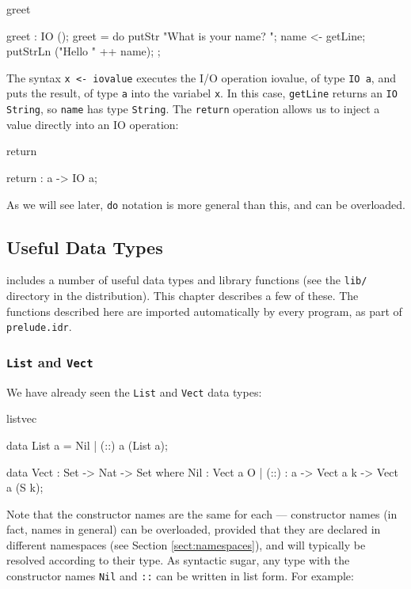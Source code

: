\begin{SaveVerbatim}{greet}

greet : IO ();
greet = do { putStr "What is your name? ";
             name <- getLine;
             putStrLn ("Hello " ++ name);
           };

\end{SaveVerbatim}

The syntax \texttt{x <- iovalue} executes the I/O operation iovalue, of type 
\texttt{IO a}, and
puts the result, of type \texttt{a} into the variabel \texttt{x}. 
In this case, \texttt{getLine} returns an \texttt{IO String},
so \texttt{name} has type \texttt{String}.
The \texttt{return} operation allows us to inject a value directly into an IO
operation:

\begin{SaveVerbatim}{return}

return : a -> IO a;

\end{SaveVerbatim}

\noindent
As we will see later, \texttt{do} notation is more general than this, and can be
overloaded.

\subsection{Useful Data Types}

\Idris{} includes a number of useful data types and library functions (see the
\texttt{lib/} directory in the distribution). This chapter describes a few of these. The
functions described here are imported automatically by every \Idris{} program, as
part of \texttt{prelude.idr}.

\subsubsection{\texttt{List} and \texttt{Vect}}

We have already seen the \texttt{List} and \texttt{Vect} data types:

\begin{SaveVerbatim}{listvec}

data List a = Nil | (::) a (List a);

data Vect : Set -> Nat -> Set where
   Nil  : Vect a O
 | (::) : a -> Vect a k -> Vect a (S k);

\end{SaveVerbatim}

Note that the constructor names are the same for each --- constructor names (in
fact, names in general) can be overloaded, provided that they are declared in
different namespaces (see Section \ref{sect:namespaces}), and will typically be
resolved according to their type. As syntactic sugar, any type with the constructor
names \texttt{Nil} and \texttt{::} can be written in list form. For example:

